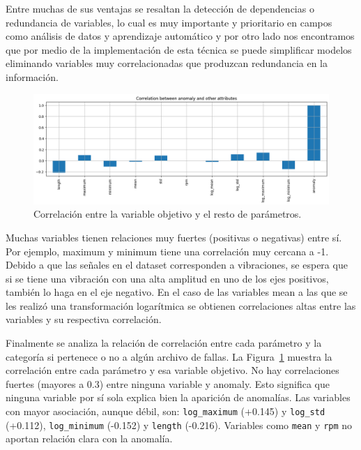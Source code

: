\documentclass[11pt,a4paper,spanish]{book}
\numberwithin{equation}{chapter}
\numberwithin{figure}{chapter}
\begin{document}
Entre muchas de sus ventajas se resaltan la detección de dependencias o redundancia de variables, lo cual es muy importante y prioritario en campos como análisis de datos y aprendizaje automático y por otro lado nos encontramos que por medio de la implementación de esta técnica se puede simplificar modelos eliminando variables muy correlacionadas que produzcan redundancia en la información. \cite{Alvarez2023}



\begin{figure}[h]
    \centering
    \includegraphics[width=1\textwidth]{media/dataset/corr-mat-target.png}
    \caption{Correlación entre la variable objetivo y el resto de parámetros.}
    \label{fig:figCorrMatTarget}
\end{figure}



Muchas variables tienen relaciones muy fuertes (positivas o negativas) entre sí. Por ejemplo,  maximum y minimum tiene una correlación muy cercana a -1. Debido a que las señales en el dataset corresponden a vibraciones, se espera que si se tiene una vibración con una alta amplitud en uno de los ejes positivos, también lo haga en el eje negativo. En el caso de las variables mean a las que se les realizó una transformación logarítmica se obtienen correlaciones altas entre las variables y su respectiva correlación. 


Finalmente se analiza la relación de correlación entre cada parámetro y la categoría si pertenece o no a algún archivo de fallas. La Figura~\ref{fig:figCorrMatTarget} muestra la correlación entre cada parámetro y esa variable objetivo. No hay correlaciones fuertes (mayores a 0.3) entre ninguna variable y anomaly. 
Esto significa que ninguna variable por sí sola explica bien la aparición de anomalías. 
Las variables con mayor asociación, aunque débil, son: \lstinline|log_maximum| (+0.145) y \lstinline|log_std| (+0.112), \lstinline|log_minimum| (-0.152) y \lstinline|length| (-0.216).
Variables como \lstinline|mean| y \lstinline|rpm| no aportan relación clara con la anomalía.
\end{document}
